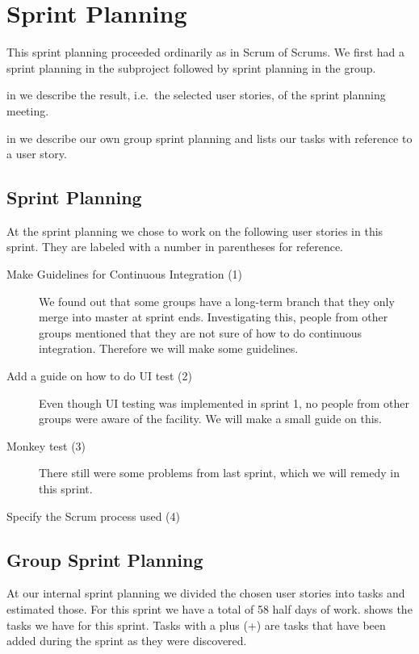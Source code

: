 \chapter{Sprint Planning}
This sprint planning proceeded ordinarily as in Scrum of Scrums. We first had a sprint planning in the subproject followed by sprint planning in the group.

\begin{chapterorganization}
  \item in  we describe the result, i.e.\ the selected user stories, of the \bd sprint planning meeting.
  \item in  we describe our own group sprint planning and lists our tasks with reference to a user story.
\end{chapterorganization}


\section{\bdtitle Sprint Planning}\label{sec:S3_bd}
At the \bd sprint planning we chose to work on the following user stories in this sprint. They are labeled with a number in parentheses for reference. 

\begin{description}
  \item[Make Guidelines for Continuous Integration (1)] We found out that some groups have a long-term branch that they only merge into master at sprint ends. Investigating this, people from other groups mentioned that they are not sure of how to do continuous integration. Therefore we will make some guidelines.
  \item[Add a guide on how to do UI test (2)] Even though UI testing was implemented in sprint 1, no people from other groups were aware of the facility. We will make a small guide on this.
  \item[Monkey test (3)] There still were some problems from last sprint, which we will remedy in this sprint.
  \item[Specify the Scrum process used (4)] 
\end{description}

\section{Group Sprint Planning}\label{sec:S3_group}
At our internal sprint planning we divided the chosen user stories into tasks and estimated those. For this sprint we have a total of 58 half days of work.  shows the tasks we have for this sprint. %
Tasks with a plus (+) are tasks that have been added during the sprint as they were discovered.

